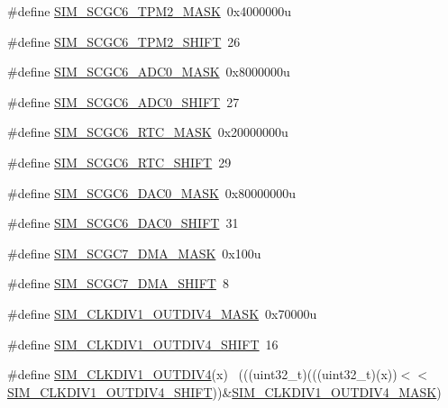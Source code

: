 \begin{DoxyCompactItemize}
\item 
\#define \hyperlink{group___s_i_m___register___masks_ga6e18a8c1e42f318d03294d14df255132}{S\+I\+M\+\_\+\+S\+C\+G\+C6\+\_\+\+T\+P\+M2\+\_\+\+M\+A\+SK}~0x4000000u
\item 
\#define \hyperlink{group___s_i_m___register___masks_gafc1cb84a2b2b306b043c31ed98213ff0}{S\+I\+M\+\_\+\+S\+C\+G\+C6\+\_\+\+T\+P\+M2\+\_\+\+S\+H\+I\+FT}~26
\item 
\#define \hyperlink{group___s_i_m___register___masks_ga481c725e02da6a245c9d715307969f09}{S\+I\+M\+\_\+\+S\+C\+G\+C6\+\_\+\+A\+D\+C0\+\_\+\+M\+A\+SK}~0x8000000u
\item 
\#define \hyperlink{group___s_i_m___register___masks_ga3f62de5fc5ccaa13d6975cf1e0ebba03}{S\+I\+M\+\_\+\+S\+C\+G\+C6\+\_\+\+A\+D\+C0\+\_\+\+S\+H\+I\+FT}~27
\item 
\#define \hyperlink{group___s_i_m___register___masks_gad51b16006c9f793c4b342ea1ff91a846}{S\+I\+M\+\_\+\+S\+C\+G\+C6\+\_\+\+R\+T\+C\+\_\+\+M\+A\+SK}~0x20000000u
\item 
\#define \hyperlink{group___s_i_m___register___masks_gac04e5a3a7a2848658a30e7c89f791f39}{S\+I\+M\+\_\+\+S\+C\+G\+C6\+\_\+\+R\+T\+C\+\_\+\+S\+H\+I\+FT}~29
\item 
\#define \hyperlink{group___s_i_m___register___masks_ga67d96adcce9fece065ce6a7f57f495a1}{S\+I\+M\+\_\+\+S\+C\+G\+C6\+\_\+\+D\+A\+C0\+\_\+\+M\+A\+SK}~0x80000000u
\item 
\#define \hyperlink{group___s_i_m___register___masks_ga263123e8c1970021957fa8e72cf4a25a}{S\+I\+M\+\_\+\+S\+C\+G\+C6\+\_\+\+D\+A\+C0\+\_\+\+S\+H\+I\+FT}~31
\item 
\#define \hyperlink{group___s_i_m___register___masks_gac559e129885604991932101719e3b368}{S\+I\+M\+\_\+\+S\+C\+G\+C7\+\_\+\+D\+M\+A\+\_\+\+M\+A\+SK}~0x100u
\item 
\#define \hyperlink{group___s_i_m___register___masks_ga1113f1622eb2e4099653e93943a89c6e}{S\+I\+M\+\_\+\+S\+C\+G\+C7\+\_\+\+D\+M\+A\+\_\+\+S\+H\+I\+FT}~8
\item 
\#define \hyperlink{group___s_i_m___register___masks_gaa2a972171bb5a662e1b4993b042f7180}{S\+I\+M\+\_\+\+C\+L\+K\+D\+I\+V1\+\_\+\+O\+U\+T\+D\+I\+V4\+\_\+\+M\+A\+SK}~0x70000u
\item 
\#define \hyperlink{group___s_i_m___register___masks_ga053a7a1ffc9f3b6834679c63ca0ebe29}{S\+I\+M\+\_\+\+C\+L\+K\+D\+I\+V1\+\_\+\+O\+U\+T\+D\+I\+V4\+\_\+\+S\+H\+I\+FT}~16
\item 
\#define \hyperlink{group___s_i_m___register___masks_ga1c33604ada20447d39b21e0f39c9dcd0}{S\+I\+M\+\_\+\+C\+L\+K\+D\+I\+V1\+\_\+\+O\+U\+T\+D\+I\+V4}(x)                                  ~(((uint32\+\_\+t)(((uint32\+\_\+t)(x))$<$$<$\hyperlink{group___s_i_m___register___masks_ga053a7a1ffc9f3b6834679c63ca0ebe29}{S\+I\+M\+\_\+\+C\+L\+K\+D\+I\+V1\+\_\+\+O\+U\+T\+D\+I\+V4\+\_\+\+S\+H\+I\+FT}))\&\hyperlink{group___s_i_m___register___masks_gaa2a972171bb5a662e1b4993b042f7180}{S\+I\+M\+\_\+\+C\+L\+K\+D\+I\+V1\+\_\+\+O\+U\+T\+D\+I\+V4\+\_\+\+M\+A\+SK})
$$
\end{DoxyCompactItemize}
